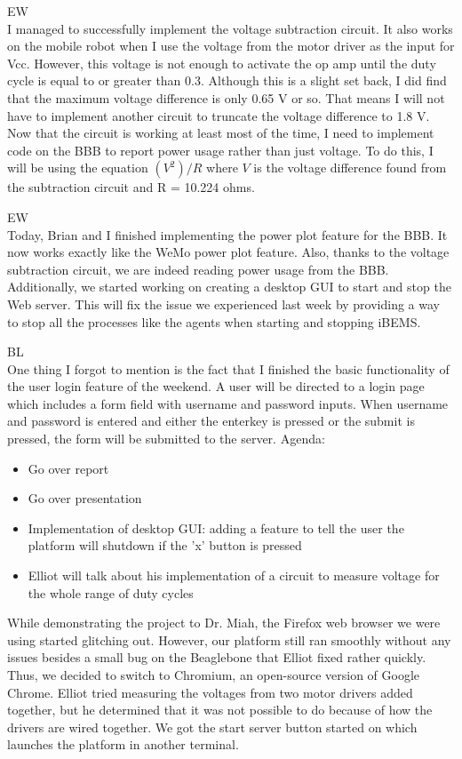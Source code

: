 \documentclass[fontsize=11pt, %
                             paper=letter, %
                             openany, %
                             captions=tableheading,
                             index=totoc,
                             hyperref]{labbook}
\begin{document}
EW\\
I managed to successfully implement the voltage subtraction circuit. It also works on the mobile robot when I use the voltage from the motor driver as the input for Vcc. However, this voltage is not enough to activate the op amp until the duty cycle is equal to or greater than 0.3. Although this is a slight set back, I did find that the maximum voltage difference is only 0.65 V or so. That means I will not have to implement another circuit to truncate the voltage difference to 1.8 V.
Now that the circuit is working at least most of the time, I need to implement code on the BBB to report power usage rather than just voltage. To do this, I will be using the equation $(V^2)/R$ where $V$ is the voltage difference found from the subtraction circuit and R = 10.224 ohms.

EW\\
Today, Brian and I finished implementing the power plot feature for the BBB. It now works exactly like the WeMo power plot feature. Also, thanks to the voltage subtraction circuit, we are indeed reading power usage from the BBB.
\medbreak\noindent
Additionally, we started working on creating a desktop GUI to start and stop the Web server. This will fix the issue we experienced last week by providing a way to stop all the processes like the agents when starting and stopping iBEMS.

BL\\
One thing I forgot to mention is the fact that I finished the basic functionality of the user login feature of the weekend. A user will be directed to a login page which includes a form field with username and password inputs. When username and password is entered and either the enterkey is pressed or the submit is pressed, the form will be submitted to the server. 
Agenda:
\begin{itemize}
\item Go over report
\item Go over presentation
\item Implementation of desktop GUI: adding a feature to tell the user the platform will shutdown if the 'x' button is pressed
\item Elliot will talk about his implementation of a circuit to measure voltage for the whole range of duty cycles
\end{itemize}
While demonstrating the project to Dr. Miah, the Firefox web browser we were using started glitching out. However, our platform still ran smoothly without any issues besides a small bug on the Beaglebone that Elliot fixed rather quickly. Thus, we decided to switch to Chromium, an open-source version of Google Chrome. Elliot tried measuring the voltages from two motor drivers added together, but he determined that it was not possible to do because of how the drivers are wired together. We got the start server button started on which launches the platform in another terminal.
\end{document}
